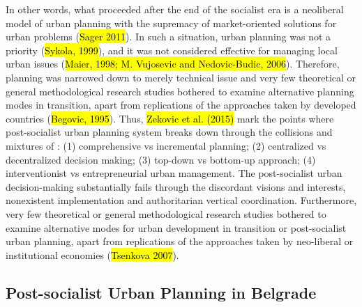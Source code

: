 \documentclass[11pt]{report}
\begin{document}
In other words, what proceeded after the end of the socialist era is a neoliberal model of urban planning with the supremacy of market-oriented solutions for urban problems (\hl{Sager 2011}).
In such a situation, urban planning was not a priority (\hl{Sykola, 1999}), and it was not considered effective for managing local urban issues (\hl{Maier, 1998; M. Vujosevic and Nedovic-Budic, 2006}).
Therefore, planning was narrowed down to merely technical issue and very few theoretical or general methodological research studies bothered to examine alternative planning modes in transition, apart from replications of the approaches taken by developed countries (\hl{Begovic, 1995}).
Thus, \hl{Zekovic et al. (2015)} mark the points where post-socialist urban planning system breaks down through the collisions and mixtures of :
(1) comprehensive vs incremental planning; 
(2) centralized vs decentralized decision making;
(3) top-down vs bottom-up approach;
(4) interventionist vs entrepreneurial urban management.
The post-socialist urban decision-making substantially fails through the discordant visions and interests, nonexistent implementation and authoritarian vertical coordination.
Furthermore, very few theoretical or general methodological research studies bothered to examine alternative  modes  for  urban  development  in  transition or post-socialist urban planning,  apart  from  replications  of  the  approaches  taken  by  neo-liberal  or institutional economies (\hl{Tsenkova 2007}).

\subsection{Post-socialist Urban Planning in Belgrade}
\end{document}
